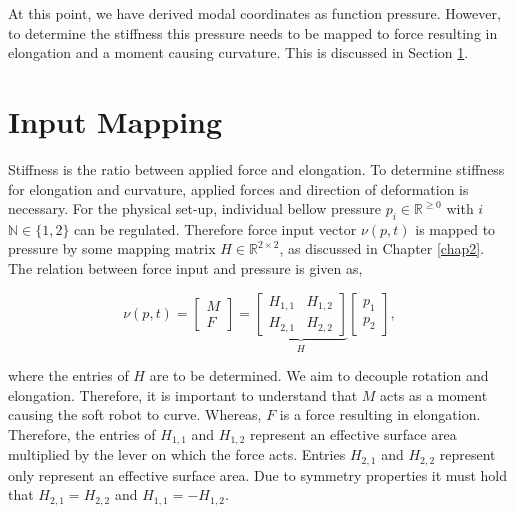 At this point, we have derived modal coordinates as function pressure. However, to determine the stiffness this pressure needs to be mapped to force resulting in elongation and a moment causing curvature. This is discussed in Section \ref{sec3:InputMapping}.






\section{Input Mapping}
\label{sec3:InputMapping}

Stiffness is the ratio between applied force and elongation. To determine stiffness for elongation and curvature, applied forces and direction of deformation is necessary. For the physical set-up, individual bellow pressure $p_i \in \mathbb{R}^{\geq 0}$ with $i$ $\mathbb{N} \in \{1,2\}$ can be regulated. Therefore force input vector $\nu(p,t)$ is mapped to pressure by some mapping matrix $H \in \mathbb{R}^{2 \times 2}$, as discussed in Chapter \ref{chap2}. The relation between force input and pressure is given as, 

\begin{equation}
   \nu(p,t) =   \begin{bmatrix} M \\ F \end{bmatrix}     = \underbrace{\begin{bmatrix}  H_{1,1} & H_{1,2} \\ H_{2,1} & H_{2,2} \end{bmatrix}}_{H}         \begin{bmatrix}  p_1 \\ p_2 \end{bmatrix}, \label{eq3:H}
\end{equation}

where the entries of $H$ are to be determined. We aim to decouple rotation and elongation. Therefore, it is important to understand that $M$ acts as a moment causing the soft robot to curve. Whereas, $F$ is a force resulting in elongation. Therefore, the entries of $H_{1,1}$ and $H_{1,2}$ represent an effective surface area multiplied by the lever on which the force acts. Entries $H_{2,1}$ and $H_{2,2}$ represent only represent an effective surface area. Due to symmetry properties it must hold that $H_{2,1} = H_{2,2}$ and $H_{1,1} = -H_{1,2}$.

